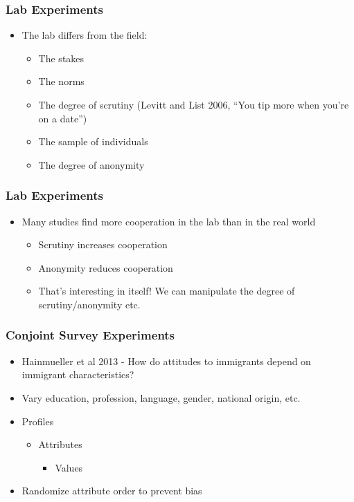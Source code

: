\documentclass[xcolor=x11names,compress]{beamer}\usepackage[]{graphicx}\usepackage[]{color}
\renewcommand{\(}{\begin{columns}}
\renewcommand{\)}{\end{columns}}
\newcommand{\<}[1]{\begin{column}{#1}}
\renewcommand{\>}{\end{column}}
\begin{document}
\begin{frame}
\frametitle{Lab Experiments}
\begin{itemize}
\item The lab differs from the field:
\pause
\begin{itemize}
\item The stakes
\item The norms
\item The degree of scrutiny (Levitt and List 2006, ``You tip more when you're on a date'')
\item The sample of individuals
\item The degree of anonymity
\end{itemize}
\end{itemize}
\end{frame}

\begin{frame}
\frametitle{Lab Experiments}
\begin{itemize}
\item Many studies find more cooperation in the lab than in the real world
\pause
\begin{itemize}
\item Scrutiny increases cooperation
\pause
\item Anonymity reduces cooperation
\pause
\item That's interesting in itself! We can manipulate the degree of scrutiny/anonymity etc.
\end{itemize}
\end{itemize}
\end{frame}

\begin{frame}
\frametitle{Conjoint Survey Experiments}
\begin{itemize}
\item Hainmueller et al 2013 - How do attitudes to immigrants depend on immigrant characteristics?
\pause
\item Vary education, profession, language, gender, national origin, etc.
\pause
\item Profiles
\begin{itemize}
\item Attributes
\begin{itemize}
\item Values
\pause
\end{itemize}
\end{itemize}
\item Randomize attribute order to prevent bias
\end{itemize}
\end{frame}
\end{document}
